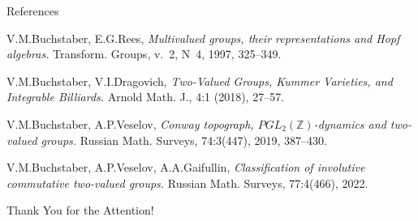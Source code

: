 \documentclass{beamer}
\begin{document}
\begin{frame}{References}
\begin{thebibliography}{99}%
\small{
 V.M.Buchstaber, E.G.Rees,
\newblock\emph{Multivalued groups, their representations and Hopf algebras.}
\newblock Transform. Groups, v.~2, N~4, 1997, 325--349.

 V.M.Buchstaber, V.I.Dragovich,
\newblock \emph{Two-Valued Groups, Kummer Varieties, and Integrable Billiards.}
\newblock Arnold Math. J., 4:1 (2018), 27--57.

 V.M.Buchstaber, A.P.Veselov,
\newblock \emph{Conway topograph, $PGL_2(\mathbb Z)$-dynamics and two-valued groups.}
\newblock Russian Math. Surveys, 74:3(447), 2019, 387--430.

 V.M.Buchstaber, A.P.Veselov, A.A.Gaifullin,
\newblock \emph{Classification of involutive commutative two-valued groups.}
\newblock  Russian Math. Surveys, 77:4(466), 2022.
}
\end{thebibliography}

\end{frame}




\begin{frame}
\begin{center}
\Huge \alert{Thank You for the Attention!}
\end{center}
\end{frame}
\end{document}
